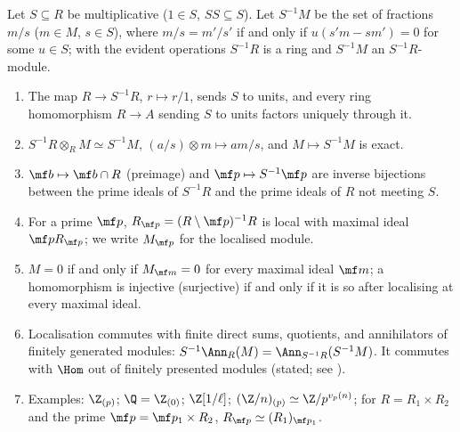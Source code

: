 \begin{theorem}[localisation]\label{thm:modules:localisation}
Let $S\subseteq R$ be multiplicative ($1\in S$, $SS\subseteq S$). Let $S^{-1}M$ be the set of fractions $m/s$ ($m\in M$, $s\in S$), where
$m/s=m'/s'$ if and only if $u(s'm-sm')=0$ for some $u\in S$; with the evident operations $S^{-1}R$ is a ring and $S^{-1}M$ an
$S^{-1}R$-module.
\begin{enumerate}[label=(\roman*)]
\item The map $R\to S^{-1}R$, $r\mapsto r/1$, sends $S$ to units, and every ring homomorphism $R\to A$ sending $S$ to units factors
uniquely through it.
\item $S^{-1}R\otimes_RM\simeq S^{-1}M$, $(a/s)\otimes m\mapsto am/s$, and $M\mapsto S^{-1}M$ is exact.
\item $\mf b\mapsto\mf b\cap R$ (preimage) and $\mf p\mapsto S^{-1}\mf p$ are inverse bijections between the prime ideals of $S^{-1}R$ and the
prime ideals of $R$ not meeting $S$.
\item For a prime $\mf p$, $R_{\mf p}=(R\setminus\mf p)^{-1}R$ is local with maximal ideal $\mf pR_{\mf p}$; we write $M_{\mf p}$ for the localised module.
\item $M=0$ if and only if $M_{\mf m}=0$ for every maximal ideal $\mf m$; a homomorphism is injective (surjective) if and only if it is
so after localising at every maximal ideal.
\item Localisation commutes with finite direct sums, quotients, and annihilators of finitely generated modules:
$S^{-1}\Ann_R(M)=\Ann_{S^{-1}R}(S^{-1}M)$. It commutes with $\Hom$ out of finitely presented modules (stated; see
\cite[Chapter 3]{AtiyahMacdonald}).
\item Examples: $\Z_{(p)}$; $\Q=\Z_{(0)}$; $\Z[1/\ell]$; $(\Z/n)_{(p)}\simeq\Z/p^{v_p(n)}$; for $R=R_1\times R_2$ and the prime
$\mf p=\mf p_1\times R_2$, $R_{\mf p}\simeq(R_1)_{\mf p_1}$.
\end{enumerate}
\end{theorem}

